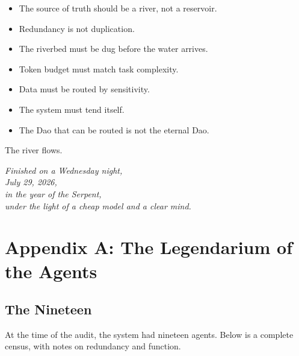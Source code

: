 \documentclass[12pt,a4paper,oneside]{book}
\begin{document}
\begin{itemize}
  \item The source of truth should be a river, not a reservoir.
  \item Redundancy is not duplication.
  \item The riverbed must be dug before the water arrives.
  \item Token budget must match task complexity.
  \item Data must be routed by sensitivity.
  \item The system must tend itself.
  \item The Dao that can be routed is not the eternal Dao.
\end{itemize}

The river flows.

\begin{flushright}
\small\itshape
Finished on a Wednesday night,\\
July 29, 2026,\\
in the year of the Serpent,\\
under the light of a cheap model and a clear mind.
\end{flushright}

\appendix

\chapter{Appendix A: The Legendarium of the Agents}

\section{The Nineteen}

At the time of the audit, the system had nineteen agents. Below is a complete census, with notes on redundancy and function.
\end{document}

